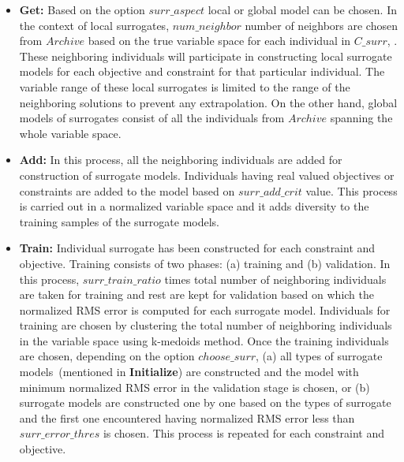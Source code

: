 \begin{itemize}
	\item \textbf{Get:} Based on the option $surr\_aspect$ local or global model can be chosen. In the context of local surrogates, $num\_neighbor$ number of neighbors are chosen from $Archive$ based on the true variable space for each individual in $C\_surr$, . These neighboring individuals will participate in constructing local surrogate models for each objective and constraint for that particular individual. The variable range of these local surrogates is limited to the range of the neighboring solutions to prevent any extrapolation. On the other hand, global models of surrogates consist of all the individuals from $Archive$ spanning the whole variable space.
	
	\item \textbf{Add:} In this process, all the neighboring individuals are added for construction of surrogate models. Individuals having real valued objectives or constraints are added to the model based on $surr\_add\_crit$ value. This process is carried out in a normalized variable space and it adds diversity to the training samples of the surrogate models.
	
	\item \textbf{Train:} Individual surrogate has been constructed for each constraint and objective. Training consists of two phases: (a) training and (b) validation. In this process, $surr\_train\_ratio$ times total number of neighboring individuals are taken for training and rest are kept for validation based on which the normalized RMS error is computed for each surrogate model. Individuals for training are chosen by clustering the total number of neighboring individuals in the variable space using k-medoids method. Once the training individuals are chosen, depending on the option $choose\_surr$, (a) all types of surrogate models~(mentioned in \textbf{Initialize}) are constructed and the model with minimum normalized RMS error in the validation stage is chosen, or (b) surrogate models are constructed one by one based on the types of surrogate and the first one encountered having normalized RMS error less than $surr\_error\_thres$ is chosen. This process is repeated for each constraint and objective. 
	

\end{itemize}
